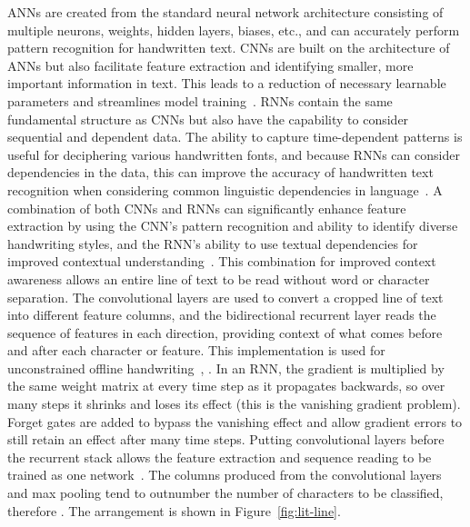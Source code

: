 ANNs are created from the standard neural network architecture consisting of multiple neurons, weights, hidden layers, biases, etc., and can accurately perform pattern recognition for handwritten text. CNNs are built on the architecture of ANNs but also facilitate feature extraction and identifying smaller, more important information in text. This leads to a reduction of necessary learnable parameters and streamlines model training~\cite{ma2023}. RNNs contain the same fundamental structure as CNNs but also have the capability to consider sequential and dependent data. The ability to capture time-dependent patterns is useful for deciphering various handwritten fonts, and because RNNs can consider dependencies in the data, this can improve the accuracy of handwritten text recognition when considering common linguistic dependencies in language~\cite{ma2023}.
A combination of both CNNs and RNNs can significantly enhance feature extraction by using the CNN's pattern recognition and ability to identify diverse handwriting styles, and the RNN's ability to use textual dependencies for improved contextual understanding~\cite{kumar2024}. This combination for improved context awareness allows an entire line of text to be read without word or character separation. The convolutional layers are used to convert a cropped line of text into different feature columns, and the bidirectional recurrent layer reads the sequence of features in each direction, providing context of what comes before and after each character or feature. This implementation is used for unconstrained offline handwriting~\cite[p.~855]{graves2009}, . In an RNN, the gradient is multiplied by the same weight matrix at every time step as it propagates backwards, so over many steps it shrinks and loses its effect (this is the vanishing gradient problem). Forget gates are added to bypass the vanishing effect and allow gradient errors to still retain an effect after many time steps. Putting convolutional layers before the recurrent stack allows the feature extraction and sequence reading to be trained as one network~\cite{shi2017}. The columns produced from the convolutional layers and max pooling tend to outnumber the number of characters to be classified, therefore . The arrangement is shown in Figure~\ref{fig:lit-line}.

